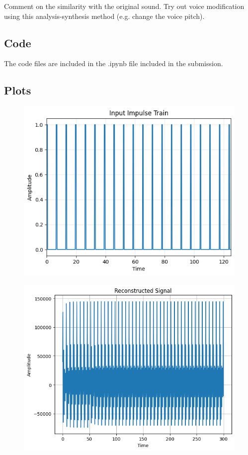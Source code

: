 \documentclass{article}
\begin{document}
Comment on the similarity with the original sound. Try out voice modification using this analysis-synthesis method (e.g. change the voice pitch).


\subsection{Code}
The code files are included in the .ipynb file included in the submission.

\subsection{Plots}

\begin{figure}[H]
\begin{center}
\includegraphics[scale = 0.8]{imp.png}
\end{center}
\end{figure}

\begin{figure}[H]
\begin{center}
\includegraphics[scale = 0.5]{rec.png}
\end{center}
\end{figure}
\end{document}
